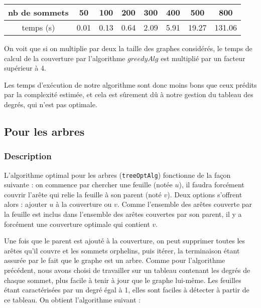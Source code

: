 \documentclass[a4paper,10pt]{article}
\begin{document}
\bigskip
\begin{tabular}{|c|c|c|c|c|c|c|c|}
	\hline 
	nb de sommets & 50 & 100 & 200 & 300 & 400 & 500 & 800  \\
	\hline
	temps (s) & 0.01 & 0.13 & 0.64 & 2.09 & 5.91 & 19.27 & 131.06 \\
	\hline
\end{tabular}

\bigskip

On voit que si on multiplie par deux la taille des graphes considérés, le temps de calcul de la couverture par l'algorithme $greedyAlg$ est multiplié par un facteur supérieur à 4.


Les temps d'exécution de notre algorithme sont donc moins bons que ceux prédits par la complexité estimée, et cela est sûrement dû à notre gestion du tableau des degrés, qui n'est pas optimale.

\subsection{Pour les arbres}

\subsubsection{Description}

L'algorithme optimal pour les arbres (\texttt{treeOptAlg}) fonctionne de la façon suivante : on commence par chercher une feuille (notée $u$), il faudra forcément couvrir l'arête qui relie la feuille à son parent (noté $v$). Deux options s'offrent alors : ajouter $u$ à la couverture ou $v$. Comme l'ensemble des arêtes couverte par la feuille est inclus dans l'ensemble des arêtes couvertes par son parent, il y a forcément une couverture optimale qui contient $v$. 

Une fois que le parent est ajouté à la couverture, on peut supprimer toutes les arêtes qu'il couvre et les sommets orphelins, puis itérer, la terminaison étant assurée par le fait que le graphe est un arbre. Comme pour l'algorithme précédent, nous avons choisi de travailler sur un tableau contenant les degrés de chaque sommet, plus facile à tenir à jour que le graphe lui-même. Les feuilles étant caractérisées par un degré égal à 1, elles sont faciles à détecter à partir de ce tableau. On obtient l'algorithme suivant :
\end{document}
